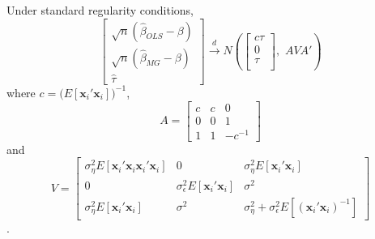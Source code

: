 \begin{thm}
\label{thm:OLSvsMG}
  Under standard regularity conditions,
\[
  \left[\begin{array}{c}
\sqrt{n} (\widehat{\beta}_{OLS} - \beta)\\
\sqrt{n} (\widehat{\beta}_{MG} - \beta)\\
\widehat{\tau}
\end{array}\right] \overset{d}{\rightarrow} N \left( 
\left[\begin{array}{c}
c\tau \\
0  \\
\tau\\
\end{array}\right],  
\,\,A V A' \right)
\]
where $c = \big(E[\mathbf{x}_i' \mathbf{x}_i] \big)^{-1}$, 
\[
A = \left[\begin{array}{ccc}
c  & c& 0\\
0& 0 & 1\\
1 & 1 & -c^{-1}
\end{array}\right] \]
and
\[
V = \left[\begin{array}{ccc}
\sigma_\eta^2 E[\mathbf{x}_i'\mathbf{x}_i\mathbf{x}_i' \mathbf{x}_i]  & 0  & \sigma_\eta^2 E[\mathbf{x}_i' \mathbf{x}_i] \\
0 & \sigma_\epsilon^2 E[\mathbf{x}_i'\mathbf{x}_i] & \sigma^2\\ 
\sigma_\eta^2 E[\mathbf{x}_i'\mathbf{x}_i] & \sigma^2 & \sigma_\eta^2 + \sigma_\epsilon^2 E[(\mathbf{x}_i'\mathbf{x}_i)^{-1} ]
\end{array}\right] \].\\
\end{thm}



